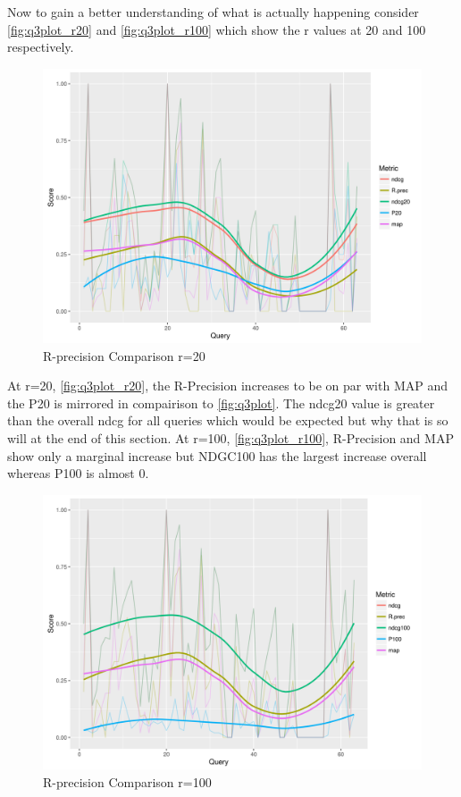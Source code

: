 \documentclass[11pt]{article}
\begin{document}
Now to gain a better understanding of what is actually happening consider \autoref{fig:q3plot_r20} and \autoref{fig:q3plot_r100} which show the r values at 20 and 100 respectively.
\begin{figure}[H]
\centering
\includegraphics[scale=0.7]{q3_plot_r20.png}
\caption{R-precision Comparison r=20} 
\label{fig:q3plot_r20}
\end{figure}
At r=20, \autoref{fig:q3plot_r20}, the R-Precision increases to be on par with MAP and the P20 is mirrored in compairison to \autoref{fig:q3plot}. The ndcg20 value is greater than the overall ndcg for all queries which would be expected but why that is so will at the end of this section. At r=100, \autoref{fig:q3plot_r100}, R-Precision and MAP show only a marginal increase but NDGC100 has the largest increase overall whereas P100 is almost 0. 
\begin{figure}[H]
\centering
\includegraphics[scale=0.7]{q3_plot_r100.png}
\caption{R-precision Comparison r=100}
\label{fig:q3plot_r100}
\end{figure}
\end{document}
